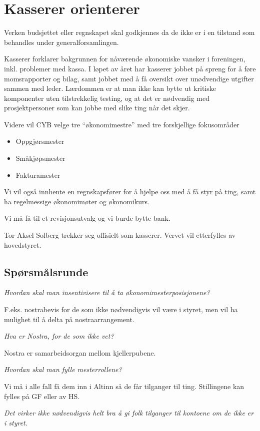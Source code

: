 \documentclass[10pt,norsk,a4paper]{article}
\begin{document}
\newpage

\section{Kasserer orienterer}
Verken budsjettet eller regnskapet skal godkjennes da
de ikke er i en tilstand som behandles under generalforsamlingen.

Kasserer forklarer bakgrunnen for nåværende økonomiske vansker i foreningen, inkl. problemer med kassa. I løpet av året har kasserer jobbet på spreng for å føre momsrapporter og bilag, samt jobbet med å få oversikt over unødvendige utgifter sammen med leder. Lærdommen er at man ikke kan bytte ut kritiske komponenter uten tilstrekkelig testing, og at det er nødvendig med prosjektpersoner som kan jobbe med slike ting når det skjer.

Videre vil CYB velge tre ``økonomimestre'' med tre forskjellige fokusområder
\begin{itemize} 
	\item Oppgjørsmester
	\item Småkjøpsmester
	\item Fakturamester
\end{itemize}

Vi vil også innhente en regnskapsfører for å hjelpe oss med å få styr på ting, samt ha regelmessige økonomimøter og økonomikurs.

Vi må få til et revisjonsutvalg og vi burde bytte bank.

Tor-Aksel Solberg trekker seg offisielt som kasserer. Vervet vil etterfylles av hovedstyret.

\subsection{Spørsmålsrunde}
\emph{Hvordan skal man insentivisere til å ta økonomimesterposisjonene?}

F.eks. nostrabevis for de som ikke nødvendigvis vil være i styret, men vil ha mulighet til å delta på nostraarrangement. 

\emph{Hva er Nostra, for de som ikke vet?}

Nostra er samarbeidsorgan mellom kjellerpubene.

\emph{Hvordan skal man fylle mesterrollene?}

Vi må i alle fall få dem inn i Altinn så de får tilganger til ting. Stillingene kan fylles på GF eller av HS.

\emph{Det virker ikke nødvendigvis helt bra å gi folk tilganger til kontoene om de ikke er i styret.}
\end{document}
